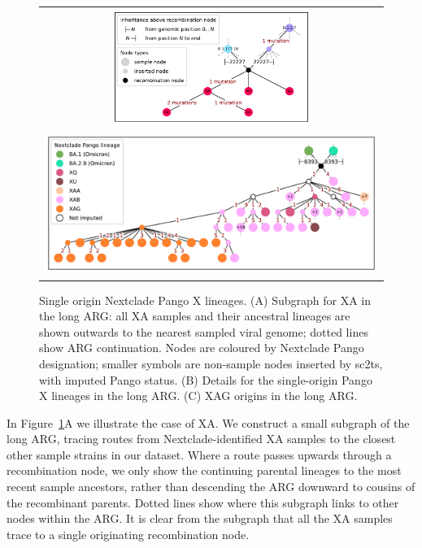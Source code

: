 \documentclass{article}
\begin{document}
\begin{figure}
\begin{tabularx}{\textwidth}{c}


\includegraphics[width=0.6\textwidth]{figures/Pango_XA_nxcld_tight_graph.pdf}
\\ %
\includegraphics[width=\textwidth]{figures/Pango_XAG_nxcld_tight_graph.pdf}
\end{tabularx}
\caption{\label{fig:pango-single-origin-graph}
Single origin Nextclade Pango X lineages. (A) Subgraph for XA in the long ARG: all XA samples and their ancestral lineages are shown outwards to the nearest sampled viral genome; dotted lines show ARG continuation. Nodes are coloured by Nextclade Pango designation; smaller symbols are non-sample nodes inserted by sc2ts, with imputed Pango status. (B) Details for the single-origin Pango X lineages in the long ARG. (C) XAG origins in the long ARG.}
\end{figure}

In Figure~\ref{fig:pango-single-origin-graph}A we illustrate the case of XA. We construct a small subgraph of the long ARG, tracing routes from Nextclade-identified XA samples to the closest other sample strains in our dataset. Where a route passes upwards through a recombination node, we only show the continuing parental lineages to the most recent sample ancestors, rather than descending the ARG downward to cousins of the recombinant parents. Dotted lines show where this subgraph links to other nodes within the ARG. It is clear from the subgraph that all the XA samples trace to a single originating recombination node.
\end{document}
